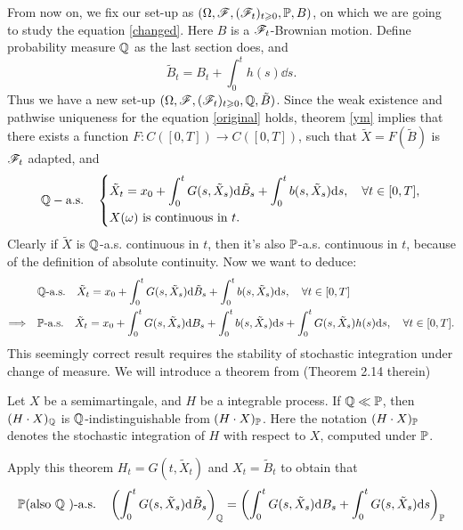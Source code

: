\documentclass[8pt,onesided]{article}
\begin{document}
From now on, we fix our set-up as $(\Omega,\mathscr{F},(\mathscr{F}_t)_{t\geqslant0}, \mathbb{P}, B)$, on which we are going to study the equation \ref{changed}. Here $B$ is a $\mathscr{F}_t$-Brownian motion. Define probability measure $\mathbb{Q}$ as the last section does, and
\begin{equation*}
    \tilde{B}_t = B_t+\int_0^t h(s)\dd s.
\end{equation*}
Thus we have a new set-up $(\Omega,\mathscr{F}, (\mathscr{F}_t)_{t\geqslant0}, \mathbb{Q},\tilde{B})$. Since the weak existence and pathwise uniqueness for the equation \ref{original} holds, theorem \ref{ym} implies that there exists a function $F:C([0,T])\to C([0,T])$, such that $\tilde{X}=F(\tilde{B})$ is $\mathscr{F}_t$ adapted, and
\begin{equation*}
    \mathbb{Q}-\text{a.s.} \quad\left\{
    \begin{aligned}
    & \tilde X_t=x_0+\int_0^t G(s,\tilde X_s)\dd\tilde B_s +\int_0^t b(s,\tilde X_s) \dd s,\quad \forall t\in[0,T],\\
        &X(\omega) \text{ is continuous in } t.
    \end{aligned}
    \right.
\end{equation*}
Clearly if $\tilde{X}$ is $\mathbb{Q}$-a.s. continuous in $t$, then it's also $\mathbb{P}$-a.s. continuous in $t$, because of the definition of absolute continuity. Now we want to deduce:
\begin{align*}
    &\mathbb{Q} \text{-a.s.}\quad \tilde X_t=x_0+\int_0^t G(s,\tilde X_s)\dd\tilde B_s +\int_0^t b(s,\tilde X_s) \dd s,\quad\forall t\in[0,T]\\
    \Longrightarrow\quad&\mathbb{P} \text{-a.s.} \quad \tilde X_t=x_0+\int_0^t G(s,\tilde X_s)\dd B_s +\int_0^t b(s,\tilde X_s) \dd s+\int_0^t G(s,\tilde X_s)h(s)\dd s,\quad\forall t\in[0,T].
\end{align*}
This seemingly correct result requires the stability of stochastic integration under change of measure. We will introduce a theorem from \cite{protter2013stochastic}(Theorem 2.14 therein)

\begin{theorem}
Let $X$ be a semimartingale, and $H$ be a integrable process. If $\mathbb{Q} \ll \mathbb{P}$, then $(H\cdot X)_{\mathbb{Q}}$ is $\mathbb{Q}$-indistinguishable from $(H\cdot X)_{\mathbb{P}}$. Here the notation $(H\cdot X)_{\mathbb{P}}$ denotes the stochastic integration of $H$ with respect to $X$, computed under $\mathbb{P}$. 
\end{theorem}

Apply this theorem $H_t=G(t, \tilde X_t)$ and $X_t=\tilde B_t$ to obtain that
\begin{equation*}
\mathbb{P}\text{(also $\mathbb{Q}$ )}\text{-a.s.} \quad
\left(\int_0^t G(s,\tilde X_s) \dd \tilde B_s\right)_{\mathbb{Q}}=\left(\int_0^t G(s,\tilde X_s) \dd B_s+\int_0^t G(s,\tilde X_s) \dd s\right)_{\mathbb{P}}
\end{equation*}
\end{document}
